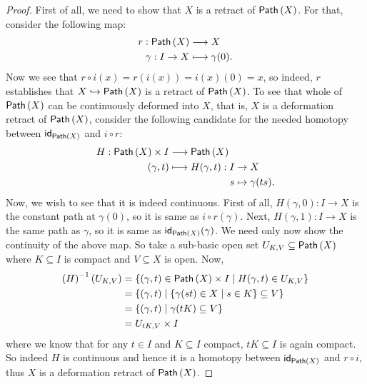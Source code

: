 \documentclass[letterpaper,11pt,twoside]{article}
\theoremstyle{definition}
\theoremstyle{definition}
\theoremstyle{definition}
\theoremstyle{definition}
\theoremstyle{definition}
\theoremstyle{definition}
\theoremstyle{remark}
\theoremstyle{definition}
\newcommand{\id}[1]{{\fontfamily{lmss}\selectfont 
		\text{id}_{#1}
}}
\newcommand{\inv}[1]{\left(#1\right)^{-1}}
\newcommand{\upps}[1]{{\fontfamily{lmss}\selectfont 
		\text{Path}\left(#1\right)
}}
\begin{document}
    \begin{proof}
       First of all, we need to show that $X$ is a retract of $\upps{X}$. For that, consider the following map:
    \begin{align*}
        r : \upps{X} &\longrightarrow X\\
                \gamma : I \to X &\longmapsto \gamma(0).
    \end{align*}
    Now we see that $r\circ i(x) = r(i(x)) = i(x)(0) = x$, so indeed, $r$ establishes that $X\hookrightarrow\upps{X}$ is a retract of $\upps{X}$. To see that whole of $\upps{X}$ can be continuously deformed into $X$, that is, $X$ is a deformation retract of $\upps{X}$, consider the following candidate for the needed homotopy between $\id{\upps{X}}$ and $i\circ r$:
    \begin{align*}
        H : \upps{X} \times I &\longrightarrow \upps{X}\\
        (\gamma, t) &\longmapsto H(\gamma,t) : I \to X\\
    &\;\;\;\;\;\;\;\;\;\;\;\;\;\;\;\;\;\;\;\;\;\; s\mapsto \gamma(ts).
    \end{align*}
    Now, we wish to see that it is indeed continuous. First of all, $H(\gamma,0) : I \to X$ is the constant path at $\gamma(0)$, so it is same as $i\circ r (\gamma)$. Next, $H(\gamma, 1) : I \to X$ is the same path as $\gamma$, so it is same as $\id{\upps{X}}(\gamma)$. We need only now show the continuity of the above map. So take a sub-basic open set $U_{K,V} \subseteq \upps{X}$ where $K\subseteq I$ is compact and $V\subseteq X$ is open. Now, 
    \begin{align*}
        \inv{H}(U_{K,V}) &= \{(\gamma,t)\in \upps{X}\times I\;\vert\; H(\gamma,t) \in U_{K,V}\}\\
        &= \{(\gamma,t) \;\vert\; \{\gamma(st) \in X\;\vert\; s\in K\} \subseteq V\}\\
        &= \{(\gamma,t)\;\vert\; \gamma(tK) \subseteq V\}\\
        &= U_{tK,V}\times I
    \end{align*}
    where we know that for any $t\in I$ and $K\subseteq I$ compact, $tK\subseteq I$ is again compact. So indeed $H$ is continuous and hence it is a homotopy between $\id{\upps{X}}$ and $r\circ i $, thus $X$ is a deformation retract of $\upps{X}$.
    \end{proof}
\end{document}
